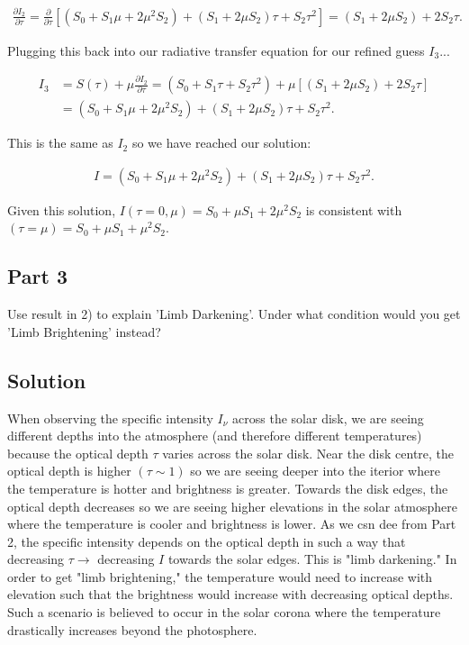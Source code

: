 \documentclass[12pt]{article}
\begin{document}
\begin{align*}
\frac{\partial I_2}{\partial \tau} = \frac{\partial}{\partial \tau}\left[(S_0+S_1 \mu+2\mu^2S_2) + (S_1+2\mu S_2)\tau + S_2\tau^2\right] = (S_1+2\mu S_2) + 2S_2\tau.
\end{align*}

Plugging this back into our radiative transfer equation for our refined guess $I_3$...

\begin{equation*}
\begin{split}
I_3 &= S(\tau) + \mu\frac{\partial I_2}{\partial \tau} = (S_0 + S_1\tau + S_2\tau^2) + \mu\left[(S_1+2\mu S_2) + 2S_2\tau\right] \\
&= (S_0+S_1 \mu+2\mu^2S_2) + (S_1+2\mu S_2)\tau + S_2\tau^2.
\end{split}
\end{equation*}

This is the same as $I_2$ so we have reached our solution:

\begin{align*}
I = (S_0+S_1 \mu+2\mu^2S_2) + (S_1+2\mu S_2)\tau + S_2\tau^2.
\end{align*}

Given this solution, $I(\tau=0,\mu) = S_0 +\mu S_1 + 2\mu^2 S_2$ is consistent with $(\tau=\mu) = S_0 + \mu S_1 + \mu^2S_2$.

\subsection*{Part 3}

Use result in 2) to explain ’Limb Darkening’. Under what condition would you get ’Limb Brightening’ instead?

\subsection*{Solution}

When observing the specific intensity $I_\nu$ across the solar disk, we are seeing different depths into the atmosphere (and therefore different temperatures) because the optical depth $\tau$ varies across the solar disk. Near the disk centre, the optical depth is higher $(\tau \sim 1)$ so we are seeing deeper into the iterior where the temperature is hotter and brightness is greater. Towards the disk edges, the optical depth decreases so we are seeing higher elevations in the solar atmosphere where the temperature is cooler and brightness is lower. As we csn dee from Part 2, the specific intensity depends on the optical depth in such a way that decreasing $\tau \rightarrow$ decreasing $I$ towards the solar edges. This is "limb darkening." In order to get "limb brightening," the temperature would need to increase with elevation such that the brightness would increase with decreasing optical depths. Such a scenario is believed to occur in the solar corona where the temperature drastically increases beyond the photosphere.
\end{document}
